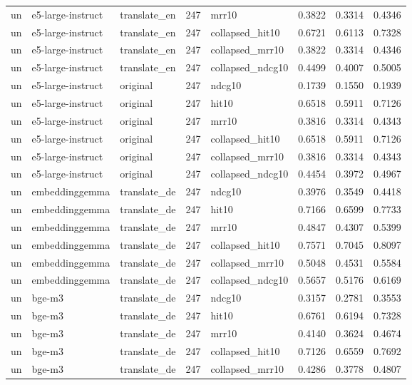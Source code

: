 \begin{tabular}{lllrlrrr}
un & e5-large-instruct & translate\_en & 247 & mrr10 & 0.3822 & 0.3314 & 0.4346 \\
un & e5-large-instruct & translate\_en & 247 & collapsed\_hit10 & 0.6721 & 0.6113 & 0.7328 \\
un & e5-large-instruct & translate\_en & 247 & collapsed\_mrr10 & 0.3822 & 0.3314 & 0.4346 \\
un & e5-large-instruct & translate\_en & 247 & collapsed\_ndcg10 & 0.4499 & 0.4007 & 0.5005 \\
un & e5-large-instruct & original & 247 & ndcg10 & 0.1739 & 0.1550 & 0.1939 \\
un & e5-large-instruct & original & 247 & hit10 & 0.6518 & 0.5911 & 0.7126 \\
un & e5-large-instruct & original & 247 & mrr10 & 0.3816 & 0.3314 & 0.4343 \\
un & e5-large-instruct & original & 247 & collapsed\_hit10 & 0.6518 & 0.5911 & 0.7126 \\
un & e5-large-instruct & original & 247 & collapsed\_mrr10 & 0.3816 & 0.3314 & 0.4343 \\
un & e5-large-instruct & original & 247 & collapsed\_ndcg10 & 0.4454 & 0.3972 & 0.4967 \\
un & embeddinggemma & translate\_de & 247 & ndcg10 & 0.3976 & 0.3549 & 0.4418 \\
un & embeddinggemma & translate\_de & 247 & hit10 & 0.7166 & 0.6599 & 0.7733 \\
un & embeddinggemma & translate\_de & 247 & mrr10 & 0.4847 & 0.4307 & 0.5399 \\
un & embeddinggemma & translate\_de & 247 & collapsed\_hit10 & 0.7571 & 0.7045 & 0.8097 \\
un & embeddinggemma & translate\_de & 247 & collapsed\_mrr10 & 0.5048 & 0.4531 & 0.5584 \\
un & embeddinggemma & translate\_de & 247 & collapsed\_ndcg10 & 0.5657 & 0.5176 & 0.6169 \\
un & bge-m3 & translate\_de & 247 & ndcg10 & 0.3157 & 0.2781 & 0.3553 \\
un & bge-m3 & translate\_de & 247 & hit10 & 0.6761 & 0.6194 & 0.7328 \\
un & bge-m3 & translate\_de & 247 & mrr10 & 0.4140 & 0.3624 & 0.4674 \\
un & bge-m3 & translate\_de & 247 & collapsed\_hit10 & 0.7126 & 0.6559 & 0.7692 \\
un & bge-m3 & translate\_de & 247 & collapsed\_mrr10 & 0.4286 & 0.3778 & 0.4807 \\

\end{tabular}
